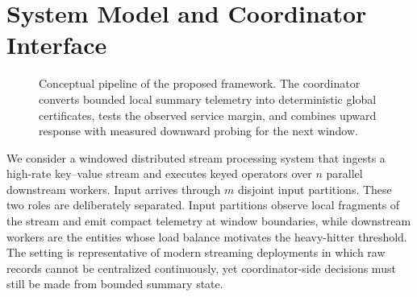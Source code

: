 \documentclass[sigconf, nonacm]{acmart}
\begin{document}
\section{System Model and Coordinator Interface}
\label{sec:problem}
\begin{figure}[t]
\centering
{}
\caption{Conceptual pipeline of the proposed framework. The coordinator converts bounded local summary telemetry into deterministic global certificates, tests the observed service margin, and combines upward response with measured downward probing for the next window.}
\label{fig:pipeline}
\end{figure}

We consider a windowed distributed stream processing system that ingests a high-rate key--value stream and executes keyed operators over \(n\) parallel downstream workers. Input arrives through \(m\) disjoint input partitions. These two roles are deliberately separated. Input partitions observe local fragments of the stream and emit compact telemetry at window boundaries, while downstream workers are the entities whose load balance motivates the heavy-hitter threshold. The setting is representative of modern streaming deployments in which raw records cannot be centralized continuously, yet coordinator-side decisions must still be made from bounded summary state.
\end{document}
